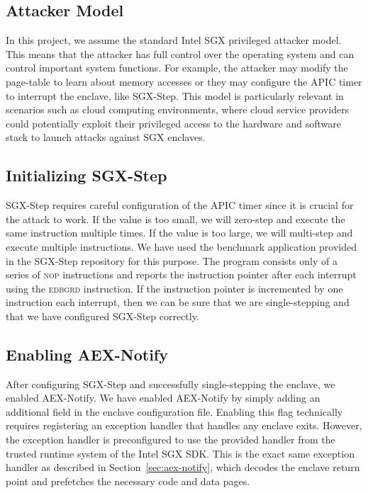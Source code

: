 \documentclass{llncs}
\begin{document}
\subsection{Attacker Model}

In this project, we assume the standard Intel SGX privileged attacker model.
This means that the attacker has full control over the operating system
and can control important system functions.
For example, the attacker may modify the page-table to learn about memory accesses
or they may configure the APIC timer to interrupt the enclave, like SGX-Step.
This model is particularly relevant in scenarios such as cloud computing
environments, where cloud service providers could potentially exploit their
privileged access to the hardware and software stack to launch attacks against SGX enclaves.

\subsection{Initializing SGX-Step}


SGX-Step requires careful configuration of the APIC timer
since it is crucial for the attack to work.
If the value is too small, we will zero-step and execute the same instruction multiple times.
If the value is too large, we will multi-step and execute multiple instructions.
We have used the benchmark application provided in the SGX-Step repository for this purpose.
The program consists only of a series of \textsc{nop} instructions and
reports the instruction pointer after each interrupt using the \textsc{edbgrd} instruction.
If the instruction pointer is incremented by one instruction each interrupt,
then we can be sure that we are single-stepping and
that we have configured SGX-Step correctly.

\subsection{Enabling AEX-Notify}

After configuring SGX-Step and successfully single-stepping the enclave,
we enabled AEX-Notify.
We have enabled AEX-Notify by simply adding an additional field in the enclave configuration file.
Enabling this flag technically requires registering an exception handler that handles any enclave exits.
However, the exception handler is preconfigured to use the provided handler
from the trusted runtime system of the Intel SGX SDK.
This is the exact same exception handler as described in Section~\ref{sec:aex-notify},
which decodes the enclave return point and prefetches the necessary code and data pages.
\end{document}
